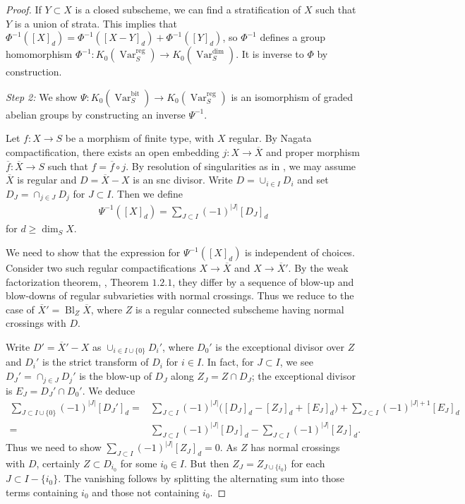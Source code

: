 \documentclass{amsart}
\theoremstyle{definition}
\DeclareMathOperator{\Var}{Var}
\DeclareMathOperator{\Bl}{Bl}
\DeclareMathOperator{\reg}{reg}
\DeclareMathOperator{\bit}{bit}
\newcommand{\KdimS}{K_0(\Var_S^{\dim})}
\numberwithin{equation}{section}
\begin{document}
\begin{proof}
If $Y \subset X$ is a closed subscheme, we can find a stratification of $X$ such that $Y$ is a union of strata. This implies that $\Phi^{-1}([X]_d) = \Phi^{-1}([X-Y]_d) + \Phi^{-1}([Y]_d)$, so $\Phi^{-1}$ defines a group homomorphism $\Phi^{-1}: K_0(\Var_S^{\reg}) \rightarrow \KdimS$. It is inverse to $\Phi$ by construction.


\textit{Step 2:} We show $\Psi: K_0(\Var_S^{\bit}) \rightarrow K_0(\Var_S^{\reg})$ is an isomorphism of graded abelian groups by constructing an inverse $\Psi^{-1}$.

Let $f:X \rightarrow S$ be a morphism of finite type, with $X$ regular. By Nagata compactification, there exists an open embedding $j: X \rightarrow \overline{X}$ and proper morphism $\overline{f}: \overline{X} \rightarrow S$ such that $f = \overline{f} \circ j$. By resolution of singularities as in \cite{temkin2008desingularization}, we may assume $\overline{X}$ is regular and $D = \overline{X} - X$ is an snc divisor. Write $D = \cup_{i \in I} D_i$ and set $D_J = \cap_{j\in J} D_j$ for $J \subset I$. Then we define
\begin{align*}
    \Psi^{-1}([X]_d) = \sum_{J \subset I} (-1)^{|J|} [ D_J ]_d
\end{align*}
for $d \geq \dim_S X$.

We need to show that the expression for $\Psi^{-1}([X]_d)$ is independent of choices. Consider two such regular compactifications $X \rightarrow \overline{X}$ and $X \rightarrow \overline{X}'$. By the weak factorization theorem, \cite{weakfactorization}, Theorem $1.2.1$, they differ by a sequence of blow-up and blow-downs of regular subvarieties with normal crossings. Thus we reduce to the case of $\overline{X}' = \Bl_Z \overline{X}$, where $Z$ is a regular connected subscheme having normal crossings with $D$.

Write $D' = \overline{X}' - X$ as $\cup_{i \in I \cup \{ 0 \}} D_i'$, where $D_0'$ is the exceptional divisor over $Z$ and $D_i'$ is the strict transform of $D_i$ for $i \in I$. In fact, for $J \subset I$, we see $D_J' = \cap_{j \in J} D_j'$ is the blow-up of $D_J$ along $Z_J = Z \cap D_J$; the exceptional divisor is $E_J = D_J' \cap D_0'$. We deduce
\begin{align*}
    \sum_{J \subset I \cup \{ 0\} } (-1)^{|J|} [D_J']_d =& \sum_{J \subset I} (-1)^{|J|} \big( [D_J]_d - [Z_J]_d + [E_J]_d \big) + \sum_{J \subset I} (-1)^{|J|+1} [E_J]_d \\
    =& \sum_{J \subset I } (-1)^{|J|} [D_J]_d - \sum_{J \subset I} (-1)^{|J|} [Z_J]_d.
\end{align*}
Thus we need to show $\sum_{J \subset I} (-1)^{|J|} [Z_J]_d = 0$. As $Z$ has normal crossings with $D$, certainly $Z \subset D_{i_0}$ for some $i_0 \in I$. But then $Z_{J} = Z_{J \cup \{ i_0 \}}$ for each $J \subset I - \{i_0\}$. The vanishing follows by splitting the alternating sum into those terms containing $i_0$ and those not containing $i_0$.


\end{proof}
\end{document}
